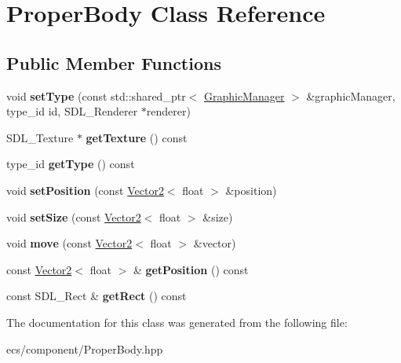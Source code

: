 \hypertarget{class_proper_body}{}\section{Proper\+Body Class Reference}
\label{class_proper_body}
\subsection*{Public Member Functions}
\begin{DoxyCompactItemize}
\item 
\mbox{\label{class_proper_body_a1360cdc97bbf40853bb6faeda572c19d}} 
void {\bfseries set\+Type} (const std\+::shared\+\_\+ptr$<$ \mbox{\hyperlink{class_graphic_manager}{Graphic\+Manager}} $>$ \&graphic\+Manager, type\+\_\+id id, S\+D\+L\+\_\+\+Renderer $\ast$renderer)
\item 
\mbox{\label{class_proper_body_ad37f72f145f1436d634ed26f9f590d75}} 
S\+D\+L\+\_\+\+Texture $\ast$ {\bfseries get\+Texture} () const
\item 
\mbox{\label{class_proper_body_a2f081a6b893934047307b29514576428}} 
type\+\_\+id {\bfseries get\+Type} () const
\item 
\mbox{\label{class_proper_body_aef60ac67f44eb2966d6accb12584f511}} 
void {\bfseries set\+Position} (const \mbox{\hyperlink{class_vector2}{Vector2}}$<$ float $>$ \&position)
\item 
\mbox{\label{class_proper_body_aabca090eeafb4400b7b8b2a5721fb010}} 
void {\bfseries set\+Size} (const \mbox{\hyperlink{class_vector2}{Vector2}}$<$ float $>$ \&size)
\item 
\mbox{\label{class_proper_body_a8ffa871e415da0b558a5776f8aaca08e}} 
void {\bfseries move} (const \mbox{\hyperlink{class_vector2}{Vector2}}$<$ float $>$ \&vector)
\item 
\mbox{\label{class_proper_body_a4c844b11dbb78d0a68a3e7e789694271}} 
const \mbox{\hyperlink{class_vector2}{Vector2}}$<$ float $>$ \& {\bfseries get\+Position} () const
\item 
\mbox{\label{class_proper_body_ae7534aa8cdf0035cc8d0b125dbaf4ae2}} 
const S\+D\+L\+\_\+\+Rect \& {\bfseries get\+Rect} () const
\end{DoxyCompactItemize}


The documentation for this class was generated from the following file\+:\begin{DoxyCompactItemize}
\item 
ecs/component/Proper\+Body.\+hpp\end{DoxyCompactItemize}

